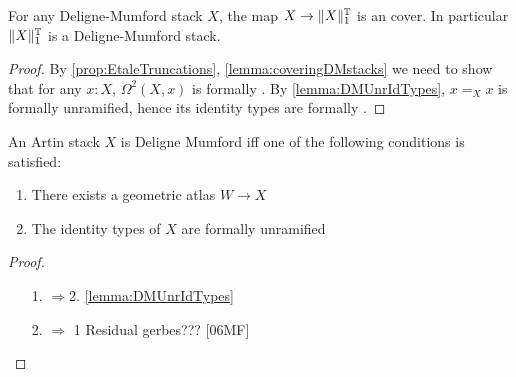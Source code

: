 \documentclass{article}
\begin{document}
\begin{theorem}
	For any Deligne-Mumford stack $X$, the map $X \to \|X\|_1^{\mathbb{T}}$ is an \etale cover. In particular $\|X\|_1^{\mathbb{T}}$ is a Deligne-Mumford stack.
\end{theorem}
\begin{proof}
	By \ref{prop:EtaleTruncations}, \ref{lemma:coveringDMstacks} we need to show that for any $x : X$, $\Omega^2(X,x)$ is formally \etale. By \ref{lemma:DMUnrIdTypes}, $x =_X x$ is formally unramified, hence its identity types are formally \etale.
\end{proof}

\begin{theorem}[TODO]
	An Artin stack $X$ is Deligne Mumford iff one of the following conditions is satisfied:
	\begin{enumerate}
		\item There exists a geometric atlas $W \to X$
		\item The identity types of $X$ are formally unramified
	\end{enumerate}
\end{theorem}
\begin{proof}
	\begin{enumerate}
		\item [1. $\Rightarrow $2.] \ref{lemma:DMUnrIdTypes}
		\item [2. $\Rightarrow$ 1] Residual gerbes??? [06MF]
	\end{enumerate}
\end{proof}
%
%	
\end{document}
